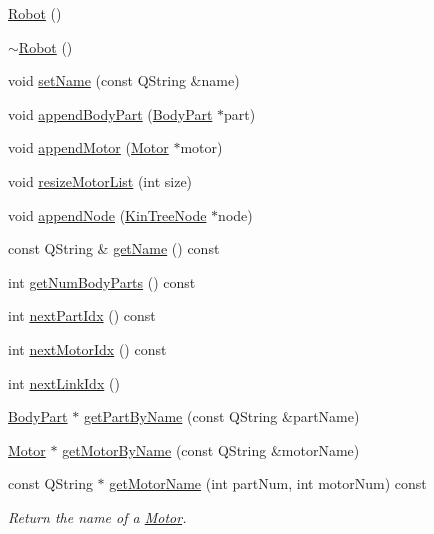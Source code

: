 \begin{DoxyCompactItemize}
\hyperlink{class_robot_model_1_1_robot_a22e9262b6ee5252f9a5171b004879b4b}{Robot} ()
\item 
\hyperlink{class_robot_model_1_1_robot_add0b7a3958eb4afd56983a56cc31dbfc}{$\sim$Robot} ()
\item 
void \hyperlink{class_robot_model_1_1_robot_a0e3187d8a543ab03029138ea836ed546}{setName} (const QString \&name)
\item 
void \hyperlink{class_robot_model_1_1_robot_a44d1922d7d9ea6c7c90360c2443b1ec3}{appendBodyPart} (\hyperlink{class_robot_model_1_1_body_part}{BodyPart} $\ast$part)
\item 
void \hyperlink{class_robot_model_1_1_robot_aa4db18e00b4e4c56a37943a0b45d1c3b}{appendMotor} (\hyperlink{class_robot_model_1_1_motor}{Motor} $\ast$motor)
\item 
void \hyperlink{class_robot_model_1_1_robot_a2521948f148183c97428155be0eea923}{resizeMotorList} (int size)
\item 
void \hyperlink{class_robot_model_1_1_robot_aa6a72690fe4b0d1a2178f5478d3829bf}{appendNode} (\hyperlink{class_robot_model_1_1_kin_tree_node}{KinTreeNode} $\ast$node)
\item 
const QString \& \hyperlink{class_robot_model_1_1_robot_a07a4dcd2c34da89415576c53b42d9406}{getName} () const 
\item 
int \hyperlink{class_robot_model_1_1_robot_a16f942cf3364608585f5a352be0dc286}{getNumBodyParts} () const 
\item 
int \hyperlink{class_robot_model_1_1_robot_ad2827f8919f3cce0d39b89fb3fb33217}{nextPartIdx} () const 
\item 
int \hyperlink{class_robot_model_1_1_robot_ac9919cc40764e47d97fa591018bfbe67}{nextMotorIdx} () const 
\item 
int \hyperlink{class_robot_model_1_1_robot_a465bb3898172af37d6dec1885da0fec0}{nextLinkIdx} ()
\item 
\hyperlink{class_robot_model_1_1_body_part}{BodyPart} $\ast$ \hyperlink{class_robot_model_1_1_robot_a5a24673b9e7b3a95f68cf543b6c2f7a0}{getPartByName} (const QString \&partName)
\item 
\hyperlink{class_robot_model_1_1_motor}{Motor} $\ast$ \hyperlink{class_robot_model_1_1_robot_a999c5f6c15891436fdfb97517d600a7a}{getMotorByName} (const QString \&motorName)
\item 
const QString $\ast$ \hyperlink{class_robot_model_1_1_robot_a13f6c53297cdc08f2ccf8e2c41a6efd3}{getMotorName} (int partNum, int motorNum) const 
\begin{DoxyCompactList}\small\item\em Return the name of a \hyperlink{class_robot_model_1_1_motor}{Motor}. \item\end{DoxyCompactList}\item 

\end{DoxyCompactItemize}

